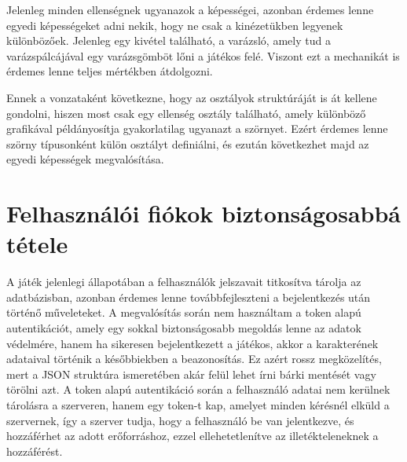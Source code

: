  Jelenleg minden ellenségnek ugyanazok a képességei, azonban érdemes lenne egyedi képességeket adni nekik, hogy ne csak a kinézetükben legyenek különbözőek. Jelenleg egy kivétel található, a varázsló, amely tud a varázspálcájával egy varázsgömböt lőni a játékos felé. Viszont ezt a mechanikát is érdemes lenne teljes mértékben átdolgozni.

Ennek a vonzataként következne, hogy az osztályok struktúráját is át kellene gondolni, hiszen most csak egy ellenség osztály található, amely különböző grafikával példányosítja gyakorlatilag ugyanazt a szörnyet. Ezért érdemes lenne szörny típusonként külön osztályt definiálni, és ezután következhet majd az egyedi képességek megvalósítása.

\section{Felhasználói fiókok biztonságosabbá tétele}
 A játék jelenlegi állapotában a felhasználók jelszavait titkosítva tárolja az adatbázisban, azonban érdemes lenne továbbfejleszteni a bejelentkezés után történő műveleteket. A megvalósítás során nem használtam a token alapú autentikációt, amely egy sokkal biztonságosabb megoldás lenne az adatok védelmére, hanem ha sikeresen bejelentkezett a játékos, akkor a karakterének adataival történik a későbbiekben a beazonosítás. Ez azért rossz megközelítés, mert a JSON struktúra ismeretében akár felül lehet írni bárki mentését vagy törölni azt. A token alapú autentikáció során a felhasználó adatai nem kerülnek tárolásra a szerveren, hanem egy token-t kap, amelyet minden kérésnél elküld a szervernek, így a szerver tudja, hogy a felhasználó be van jelentkezve, és hozzáférhet az adott erőforráshoz, ezzel ellehetetlenítve az illetékteleneknek a hozzáférést. 